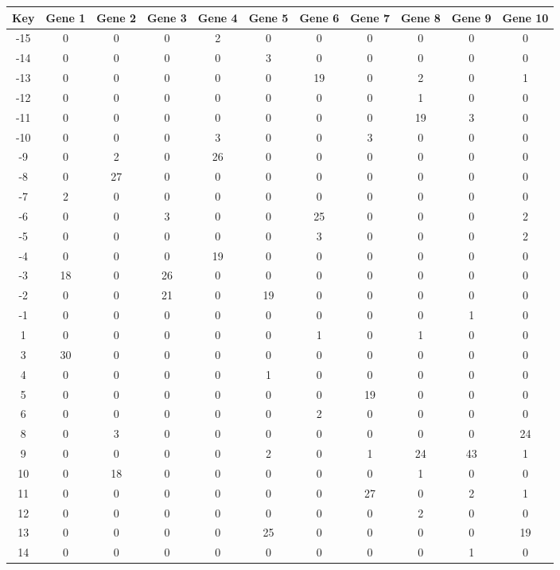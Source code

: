 \begin{tabular}{|c|c|c|c|c|c|c|c|c|c|c|}
\hline
Key & Gene 1 & Gene 2 & Gene 3 & Gene 4 & Gene 5 & Gene 6 & Gene 7 & Gene 8 & Gene 9 & Gene 10 \\
\hline
-15 & 0 & 0 & 0 & 2 & 0 & 0 & 0 & 0 & 0 & 0 \\
-14 & 0 & 0 & 0 & 0 & 3 & 0 & 0 & 0 & 0 & 0 \\
-13 & 0 & 0 & 0 & 0 & 0 & 19 & 0 & 2 & 0 & 1 \\
-12 & 0 & 0 & 0 & 0 & 0 & 0 & 0 & 1 & 0 & 0 \\
-11 & 0 & 0 & 0 & 0 & 0 & 0 & 0 & 19 & 3 & 0 \\
-10 & 0 & 0 & 0 & 3 & 0 & 0 & 3 & 0 & 0 & 0 \\
-9 & 0 & 2 & 0 & 26 & 0 & 0 & 0 & 0 & 0 & 0 \\
-8 & 0 & 27 & 0 & 0 & 0 & 0 & 0 & 0 & 0 & 0 \\
-7 & 2 & 0 & 0 & 0 & 0 & 0 & 0 & 0 & 0 & 0 \\
-6 & 0 & 0 & 3 & 0 & 0 & 25 & 0 & 0 & 0 & 2 \\
-5 & 0 & 0 & 0 & 0 & 0 & 3 & 0 & 0 & 0 & 2 \\
-4 & 0 & 0 & 0 & 19 & 0 & 0 & 0 & 0 & 0 & 0 \\
-3 & 18 & 0 & 26 & 0 & 0 & 0 & 0 & 0 & 0 & 0 \\
-2 & 0 & 0 & 21 & 0 & 19 & 0 & 0 & 0 & 0 & 0 \\
-1 & 0 & 0 & 0 & 0 & 0 & 0 & 0 & 0 & 1 & 0 \\
1 & 0 & 0 & 0 & 0 & 0 & 1 & 0 & 1 & 0 & 0 \\
3 & 30 & 0 & 0 & 0 & 0 & 0 & 0 & 0 & 0 & 0 \\
4 & 0 & 0 & 0 & 0 & 1 & 0 & 0 & 0 & 0 & 0 \\
5 & 0 & 0 & 0 & 0 & 0 & 0 & 19 & 0 & 0 & 0 \\
6 & 0 & 0 & 0 & 0 & 0 & 2 & 0 & 0 & 0 & 0 \\
8 & 0 & 3 & 0 & 0 & 0 & 0 & 0 & 0 & 0 & 24 \\
9 & 0 & 0 & 0 & 0 & 2 & 0 & 1 & 24 & 43 & 1 \\
10 & 0 & 18 & 0 & 0 & 0 & 0 & 0 & 1 & 0 & 0 \\
11 & 0 & 0 & 0 & 0 & 0 & 0 & 27 & 0 & 2 & 1 \\
12 & 0 & 0 & 0 & 0 & 0 & 0 & 0 & 2 & 0 & 0 \\
13 & 0 & 0 & 0 & 0 & 25 & 0 & 0 & 0 & 0 & 19 \\
14 & 0 & 0 & 0 & 0 & 0 & 0 & 0 & 0 & 1 & 0 \\
\hline
\end{tabular}